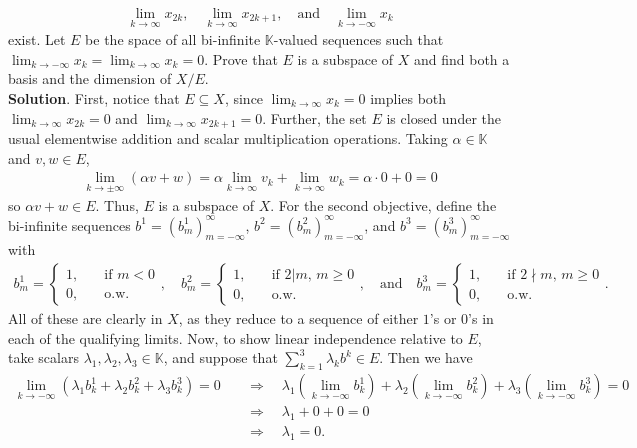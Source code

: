 \documentclass[10pt]{article}
\newcommand{\mbb}[1]{\mathbb{#1}}
\newcommand{\1}[1]{\mathbbm{1}_{#1}}
\begin{document}
    \begin{align*}
        \lim_{k\rightarrow\infty}x_{2k},\quad\lim_{k\rightarrow\infty}x_{2k+1},\quad\text{and}\quad\lim_{k\rightarrow-\infty}x_k
    \end{align*}
    exist. Let $E$ be the space of all bi-infinite $\mbb{K}$-valued sequences such that $\lim_{k\rightarrow-\infty}x_k=\lim_{k\rightarrow\infty}x_k=0$. Prove that $E$ is a subspace of $X$
    and find both a basis and the dimension of $X/E$.\\[5pt]
    {\bf Solution}. First, notice that $E\subseteq X$, since $\lim_{k\rightarrow\infty}x_k=0$ implies both $\lim_{k\rightarrow\infty}x_{2k}=0$ and $\lim_{k\rightarrow\infty}x_{2k+1}=0$. Further, the set $E$ is closed under the usual
    elementwise addition and scalar multiplication operations. Taking $\alpha\in\mbb{K}$ and $v,w\in E$,
    \begin{align*}
        \lim_{k\rightarrow\pm\infty}(\alpha v+w)=\alpha\lim_{k\rightarrow\infty}v_k+\lim_{k\rightarrow\infty}w_k=\alpha\cdot0+0=0
    \end{align*}
    so $\alpha v+w\in E$. Thus, $E$ is a subspace of $X$. For the second objective, define the bi-infinite sequences $b^1=(b^1_m)_{m=-\infty}^\infty$, $b^2=(b^2_m)_{m=-\infty}^\infty$, and $b^3=(b^3_m)_{m=-\infty}^\infty$ with
    \begin{align*}
        b^1_m=\begin{cases}
            1,\quad&\text{if $m<0$}\\
            0,\quad&\text{o.w.}
        \end{cases},\quad
        b^2_m=\begin{cases}
            1,\quad&\text{if $2|m$, $m\geq 0$}\\
            0,\quad&\text{o.w.}
        \end{cases},\quad\text{and}\quad
        b^3_m=\begin{cases}
            1,\quad&\text{if $2\nmid m$, $m\geq 0$}\\
            0,\quad&\text{o.w.}
        \end{cases}.
    \end{align*}
    All of these are clearly in $X$, as they reduce to a sequence of either $1$'s or $0$'s in each of the qualifying limits. Now, to show linear independence relative to $E$, take scalars $\lambda_1,\lambda_2,\lambda_3\in\mbb{K}$, and suppose that $\sum_{k=1}^3\lambda_kb^k\in E$. Then we have
    \begin{align*}
        \lim_{k\rightarrow-\infty}(\lambda_1b^1_k+\lambda_2b^2_k+\lambda_3b^3_k)=0\quad&\Rightarrow\quad\lambda_1(\lim_{k\rightarrow-\infty}b^1_k)+\lambda_2(\lim_{k\rightarrow -\infty}b^2_k)+\lambda_3(\lim_{k\rightarrow -\infty}b^3_k)=0\\
        &\Rightarrow\quad\lambda_1+0+0=0\\
        &\Rightarrow\quad\lambda_1=0.
    \end{align*}
\end{document}

